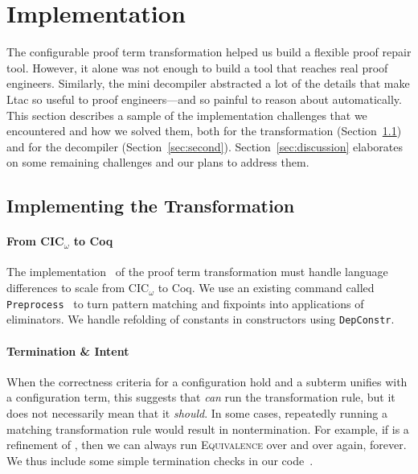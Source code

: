 \section{Implementation}
\label{sec:impl}

The configurable proof term transformation helped us build a flexible proof repair tool.
However, it alone was not enough to build a tool that reaches real proof engineers.
Similarly, the mini decompiler abstracted a lot of the details that make Ltac so useful to proof engineers---and so painful to 
reason about automatically.
This section describes a sample of the implementation challenges that we encountered and how we solved them,
both for the transformation (Section~\ref{sec:implementation}) and for the decompiler (Section~\ref{sec:second}).
Section~\ref{sec:discussion} elaborates on some remaining challenges and our plans to address them. %

\subsection{Implementing the Transformation}
\label{sec:implementation}

\paragraph{From CIC$_{\omega}$ to Coq}

The implementation~ %
of the proof term transformation must handle language differences to scale from CIC$_{\omega}$ to Coq.
We use an existing command called \lstinline{Preprocess}~\cite{Ringer2019} to turn pattern matching and fixpoints into 
applications of eliminators.
We handle refolding of constants in constructors using \lstinline{DepConstr}.

\paragraph{Termination \& Intent}

When the correctness criteria for a configuration hold and a subterm unifies with a configuration term, this suggests that \toolname \textit{can}
run the transformation rule, but it does not necessarily mean that it \textit{should}.
In some cases, repeatedly running a matching transformation rule would result in nontermination.
For example, if \B is a refinement of \A, then we can always run \textsc{Equivalence}
over and over again, forever.
We thus include some simple termination checks in our code~. %

